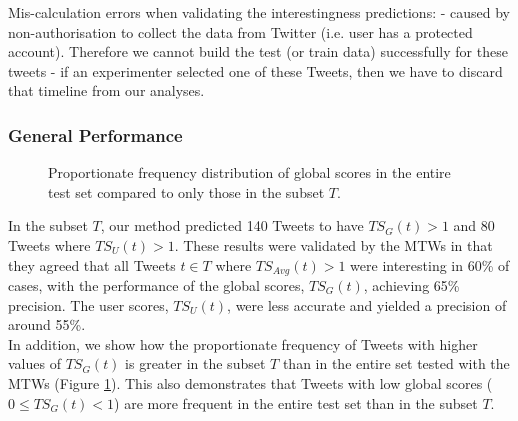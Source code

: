 \begin{enumerate}
Mis-calculation errors when validating the interestingness predictions:
 - caused by non-authorisation to collect the data from Twitter (i.e. user has a protected account). Therefore we cannot build the test (or train data) successfully for these tweets
 - if an experimenter selected one of these Tweets, then we have to discard that timeline from our analyses.

\subsubsection{General Performance}

\begin{figure}[h]
\centering{
\begin{tikzpicture}
\begin{semilogyaxis}[
    symbolic x coords={[0-1), [1-2), [2-3), [3-4), [4-5), [5-100)},
        ylabel=Proportionate frequency,
		xlabel=$TS_G(t)$,
        legend pos=north east,
        legend style={nodes=right},
        ybar,
        bar width=7pt,
        legend entries={ Chosen Tweets ($T$),  All Tested Tweets}
        ]
   \addplot[plot 0,bar group size={0}{2}]
        coordinates {([0-1),76.30057803) ([1-2),7.514450867)  ([2-3),4.335260116) ([3-4), 1.445086705) ([4-5), 2.023121387) ([5-100), 6.936416185)};
        \addplot[plot 1,bar group size={1}{2}]
        coordinates { ([0-1),80.94365552) ([1-2),6.596426935)  ([2-3),3.710490151) ([3-4), 1.099404489) ([4-5), 0.961978928) ([5-100), 4.634448007)};
        
\end{semilogyaxis}
\end{tikzpicture}
}
\caption{Proportionate frequency distribution of global scores in the entire test set compared to only those in the subset $T$.}
\label{fig:hist}
\end{figure}

In the subset $T$, our method predicted 140 Tweets to have $TS_G(t) > 1$ and 80 Tweets where $TS_U(t) > 1$.  These results were validated by the MTWs in that they agreed that all Tweets $t \in T$ where $TS_{Avg}(t) > 1$ were interesting in 60\% of cases, with the performance of the global scores, $TS_{G}(t)$, achieving 65\% precision. The user scores, $TS_{U}(t)$, were less accurate and yielded a precision of around 55\%.\\
In addition, we show how the proportionate frequency of Tweets with higher values of $TS_G(t)$ is greater in the subset $T$ than in the entire set tested with the MTWs (Figure \ref{fig:hist}). This also demonstrates that Tweets with low global scores ($0 \leq TS_G(t) < 1$) are more frequent in the entire test set than in the subset $T$.


\end{enumerate}
